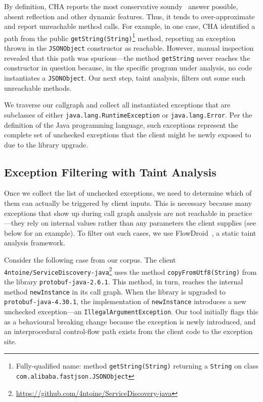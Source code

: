 By definition, CHA reports the most conservative soundy~\cite{livshits15:_in} answer possible, absent reflection and other dynamic features. Thus, it tends to over-approximate and report unreachable method calls. For example, in one case, CHA identified a path from the public \texttt{getString(String)}\footnote{Fully-qualified name: method \texttt{getString(String)} returning a \texttt{String} on class \texttt{com.alibaba.fastjson.JSONObject}} method, reporting an exception thrown in the \texttt{JSONObject} constructor as reachable. However, manual inspection revealed that this path was spurious—the method \texttt{getString} never reaches the constructor in question because, in the specific program under analysis, no code instantiates a \texttt{JSONObject}. Our next step, taint analysis, filters out some such unreachable methods.


We traverse our callgraph and collect all instantiated exceptions that are subclasses of either \texttt{java.lang.RuntimeException} or \texttt{java.lang.Error}. Per the definition of the Java programming language, such exceptions represent the complete set of unchecked exceptions that the client might be newly exposed to due to the library upgrade.

\subsection{Exception Filtering with Taint Analysis}

Once we collect the list of unchecked exceptions, we need to determine which of them can actually be triggered by client inputs. This is necessary because many exceptions that show up during call graph analysis are not reachable in practice—they rely on internal values rather than any parameters the client supplies (see below for an example). To filter out such cases, we use FlowDroid~\cite{Arzt14:_flowdroid}, a static taint analysis framework.

Consider the following case from our corpus. The client \texttt{4ntoine/ServiceDiscovery-java}\footnote{\url{https://github.com/4ntoine/ServiceDiscovery-java}} uses the method \texttt{copyFromUtf8(String)} from the library \texttt{protobuf-java-2.6.1}. This method, in turn, reaches the internal method \texttt{newInstance} in its call graph. When the library is upgraded to \texttt{protobuf-java-4.30.1}, the implementation of \texttt{newInstance} introduces a new unchecked exception—an \texttt{IllegalArgumentException}. Our tool initially flags this as a behavioural breaking change because the exception is newly introduced, and an interprocedural control-flow path exists from the client code to the exception site.

